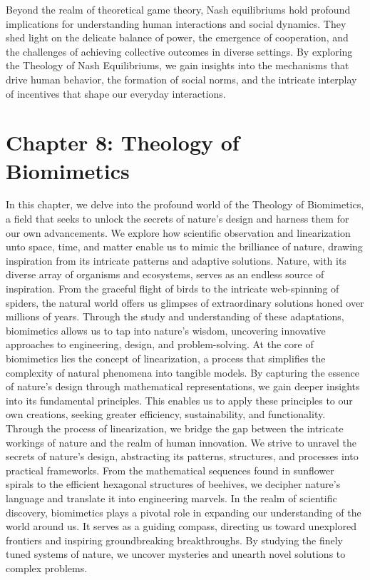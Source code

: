 \documentclass[ebook,12pt,oneside,openany]{memoir}
\begin{document}
Beyond the realm of theoretical game theory, Nash equilibriums hold profound implications for understanding human interactions and social dynamics. They shed light on the delicate balance of power, the emergence of cooperation, and the challenges of achieving collective outcomes in diverse settings. By exploring the Theology of Nash Equilibriums, we gain insights into the mechanisms that drive human behavior, the formation of social norms, and the intricate interplay of incentives that shape our everyday interactions.
\chapter*{Chapter 8: Theology of Biomimetics}
In this chapter, we delve into the profound world of the Theology of Biomimetics, a field that seeks to unlock the secrets of nature's design and harness them for our own advancements. We explore how scientific observation and linearization unto space, time, and matter enable us to mimic the brilliance of nature, drawing inspiration from its intricate patterns and adaptive solutions.
Nature, with its diverse array of organisms and ecosystems, serves as an endless source of inspiration. From the graceful flight of birds to the intricate web-spinning of spiders, the natural world offers us glimpses of extraordinary solutions honed over millions of years. Through the study and understanding of these adaptations, biomimetics allows us to tap into nature's wisdom, uncovering innovative approaches to engineering, design, and problem-solving.
At the core of biomimetics lies the concept of linearization, a process that simplifies the complexity of natural phenomena into tangible models. By capturing the essence of nature's design through mathematical representations, we gain deeper insights into its fundamental principles. This enables us to apply these principles to our own creations, seeking greater efficiency, sustainability, and functionality.
Through the process of linearization, we bridge the gap between the intricate workings of nature and the realm of human innovation. We strive to unravel the secrets of nature's design, abstracting its patterns, structures, and processes into practical frameworks. From the mathematical sequences found in sunflower spirals to the efficient hexagonal structures of beehives, we decipher nature's language and translate it into engineering marvels.
In the realm of scientific discovery, biomimetics plays a pivotal role in expanding our understanding of the world around us. It serves as a guiding compass, directing us toward unexplored frontiers and inspiring groundbreaking breakthroughs. By studying the finely tuned systems of nature, we uncover mysteries and unearth novel solutions to complex problems.
\end{document}
